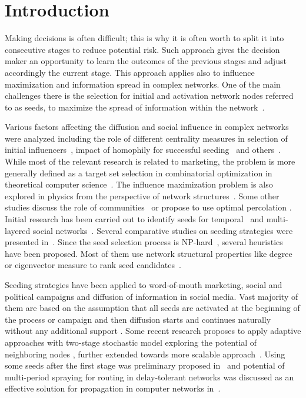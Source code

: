 \documentclass[11pt]{article} %
\begin{document}
\section*{Introduction}
Making decisions is often difficult; this is why it is often worth to split it into consecutive stages to reduce potential risk. Such approach gives the decision maker an opportunity to learn the outcomes of the previous stages and adjust accordingly the current stage. This approach applies also to influence maximization and information spread in complex networks. One of the main challenges there is the selection for initial and activation network nodes referred to as seeds, to maximize the spread of information within the network~\cite{Kempe:2003}. %

Various factors affecting the diffusion and social influence in complex networks were analyzed including the role of different centrality measures in selection of initial influencers~\cite{Kiss2008}, impact of homophily for successful seeding~\cite{Nejad:2015} and others~\cite{liu2012seeding}. While most of the relevant research is related to marketing, the problem is more generally defined as a target set selection in combinatorial optimization in theoretical computer science~\cite{Ackerman:2010,Ben-Zwi:2011,Chiang:2013}. The influence maximization problem is also explored in physics from the perspective of network structures~\cite{Galstyan2009}. Some other studies discuss the role of communities~\cite{He2015} or propose to use optimal percolation \cite{Morone:2015}. Initial research has been carried out to identify seeds for temporal~\cite{Michalski:2014,jankowski2013} and multi-layered social networks~\cite{Michalski:2013}. Several comparative studies on seeding strategies were presented in~\cite{Hinz:2011,Libai:2013}. Since the seed selection process is NP-hard~\cite{Kempe:2003}, several heuristics have been proposed. Most of them use network structural properties like degree or eigenvector measure to rank seed candidates~\cite{Hinz:2011}.

Seeding strategies have been applied to word-of-mouth marketing, social and political campaigns and diffusion of information in social media. Vast majority of them are based on the assumption that all seeds are activated at the beginning of the process or campaign and then diffusion starts and continues naturally without any additional support \cite{Hinz:2011}. Some recent research proposes to apply adaptive approaches with two-stage stochastic model exploring the potential of neighboring nodes \cite{Seeman2013}, further extended towards more scalable approach~\cite{Horel2015}. Using some seeds after the first stage was preliminary proposed in~\cite{sela2015improving,zhang2015dynamic} and potential of multi-period spraying for routing in delay-tolerant networks was discussed as an effective solution for propagation in computer networks in~\cite{Szymanski:2010}.
\end{document}
